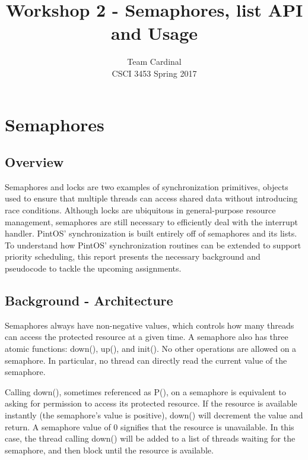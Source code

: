 \documentclass[11pt, letterpaper]{article}
\begin{document}

\title{Workshop 2 - Semaphores, list API and Usage}
\author{Team Cardinal\\CSCI 3453 Spring 2017}
\maketitle




\section{Semaphores}

\subsection{Overview}
Semaphores and locks are two examples of synchronization primitives, objects used to ensure that multiple threads can access shared data without introducing race conditions. Although locks are ubiquitous in general-purpose resource management, semaphores are still necessary to efficiently deal with the interrupt handler. PintOS’ synchronization is built entirely off of semaphores and its lists. To understand how PintOS’ synchronization routines can be extended to support priority scheduling, this report presents the necessary background and pseudocode to tackle the upcoming assignments.


\subsection{Background - Architecture}
Semaphores always have non-negative values, which controls how many threads can access the protected resource at a given time. A semaphore also has three atomic functions: down(), up(), and init(). No other operations are allowed on a semaphore. In particular, no thread can directly read the current value of the semaphore.

Calling down(), sometimes referenced as P(), on a semaphore is equivalent to asking for permission to access its protected resource. If the resource is available instantly (the semaphore’s value is positive), down() will decrement the value and return. A semaphore value of 0 signifies that the resource is unavailable. In this case, the thread calling down() will be added to a list of threads waiting for the semaphore, and then block until the resource is available.
\end{document}

